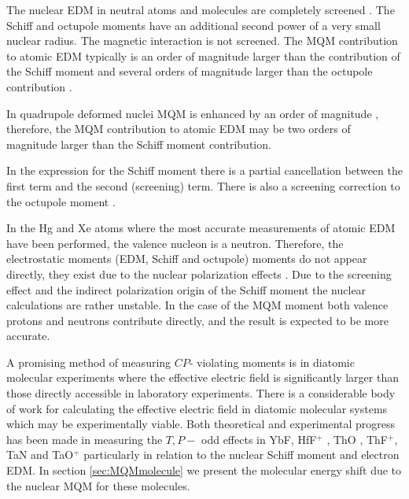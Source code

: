 \documentclass[10pt,a4paper, twoside, openright]{report}
\begin{document}
The nuclear EDM  in neutral atoms and molecules are completely screened \cite{Schiff1963}. The Schiff and octupole moments have an additional second power of a very small nuclear radius. The magnetic interaction is not screened. The MQM contribution to atomic EDM typically is an order of magnitude larger than the contribution of the Schiff moment and several orders of magnitude larger than the octupole contribution \cite{SFK1984, Flambaum1997}.  

In quadrupole deformed nuclei MQM is enhanced by an order of magnitude \cite{Flambaum1994}, therefore, the MQM contribution to atomic EDM may be two orders of magnitude larger than the Schiff moment contribution.

In the expression for the Schiff moment there is a partial cancellation between the first term and the second (screening) term. There is also a screening correction to the octupole moment \cite{ Flambaum1986, SFK1984, Flambaum2012}.

 In the Hg and Xe atoms  where the most accurate measurements of atomic EDM have been performed, the valence nucleon is a neutron. Therefore, the electrostatic moments (EDM, Schiff and octupole) moments do not appear directly, they exist due to the nuclear polarization effects \cite{Flambaum1986}. Due to the screening effect and the indirect polarization origin of the Schiff moment the nuclear calculations are rather unstable.
In the case of the MQM moment both valence protons and neutrons  contribute directly, and the result is expected to be more accurate\cite{Flambaum2014}.  


 A promising method of measuring $CP$- violating moments is in diatomic molecular experiments where the effective electric field is significantly larger than those directly accessible in laboratory experiments.  There is a considerable body of work for calculating the effective electric field in diatomic molecular systems which may be experimentally viable. Both theoretical and experimental progress has been made in measuring the $T,P-$ odd effects in  YbF\cite{Hudson2011, Mosyagin1998, Quiney1998, Parpia1998, Kozlov1994, Nayak2009, Steimle2007, Abe2014}, HfF$^+$ \cite{Cossel2012, Loh2013, Petrov2007, Fleig2013, Meyer2006, Skripnikov2008Hf, Le2013, Skripnikov2017Hf, Cairncross2017}, ThO \cite{Petrov2014, Meyer2008, Skripnikov2013ThO, Skripnikov2014ThO, Titov2015ThO, Fleig2014, Denis2016, Baron2017}, ThF$^+$\cite{Loh2013, Skripnikov2015Th, Denis2015}, TaN \cite{Skripnikov2015Ta, Fleig2016TaN} and TaO$^+$ \cite{Fleig2018} particularly in relation to the nuclear Schiff moment and electron EDM.   In section \ref{sec:MQMmolecule} we present the molecular energy shift due to the nuclear MQM for these molecules.
 
\end{document}
